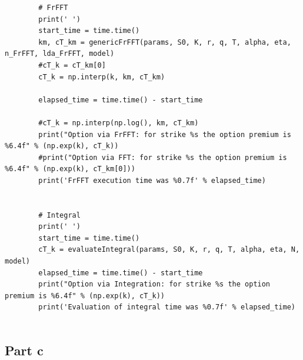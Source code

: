 \documentclass[letterpaper]{article}
\begin{document}
\begin{lstlisting}
       	# FrFFT
       	print(' ')
       	start_time = time.time()
       	km, cT_km = genericFrFFT(params, S0, K, r, q, T, alpha, eta, n_FrFFT, lda_FrFFT, model)
       	#cT_k = cT_km[0]
       	cT_k = np.interp(k, km, cT_km)
       	
       	elapsed_time = time.time() - start_time
       	
       	#cT_k = np.interp(np.log(), km, cT_km)
       	print("Option via FrFFT: for strike %s the option premium is %6.4f" % (np.exp(k), cT_k))
       	#print("Option via FFT: for strike %s the option premium is %6.4f" % (np.exp(k), cT_km[0]))
       	print('FrFFT execution time was %0.7f' % elapsed_time)
       	
       	
       	# Integral
       	print(' ')
       	start_time = time.time()
       	cT_k = evaluateIntegral(params, S0, K, r, q, T, alpha, eta, N, model)
       	elapsed_time = time.time() - start_time
       	print("Option via Integration: for strike %s the option premium is %6.4f" % (np.exp(k), cT_k))
       	print('Evaluation of integral time was %0.7f' % elapsed_time)
       	
       	 \end{lstlisting}
	
\subsection{Part c}
   
\end{document}

